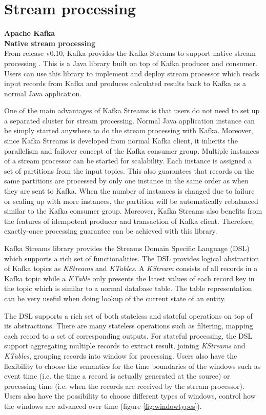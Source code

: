 \section{Stream processing}
\large \textbf{Apache Kafka}\\
\normalsize
\textbf{Native stream processing}\\
From release v0.10, Kafka provides the Kafka Streams to support native stream processing \cite{kafkastreams}. This is a Java library built on top of Kafka producer and consumer. Users can use this library to implement and deploy stream processor which reads input records from Kafka and produces calculated results back to Kafka as a normal Java application. 

One of the main advantages of Kafka Streams is that users do not need to set up a separated cluster for stream processing. Normal Java application instance can be simply started anywhere to do the stream processing with Kafka. Moreover, since Kafka Streams is developed from normal Kafka client, it inherits the parallelism and failover concept of the Kafka consumer group. Multiple instances of a stream processor can be started for scalability. Each instance is assigned a set of partitions from the input topics. This also guarantees that records on the same partitions are processed by only one instance in the same order as when they are sent to Kafka. When the number of instances is changed due to failure or scaling up with more instances, the partition will be automatically rebalanced similar to the Kafka consumer group. Moreover, Kafka Streams also benefits from the features of idempotent producer and transaction of Kafka client. Therefore, exactly-once processing guarantee can be achieved with this library.

Kafka Streams library provides the Streams Domain Specific Language (DSL) which supports a rich set of functionalities. The DSL provides logical abstraction of Kafka topics as \emph{KStreams} and \emph{KTables}. A \emph{KStream} consists of all records in a Kafka topic while a \emph{KTable} only presents the latest values of each record key in the topic which is similar to a normal database table. The table representation can be very useful when doing lookup of the current state of an entity. 

The DSL supports a rich set of both stateless and stateful operations on top of its abstractions. There are many stateless operations such as filtering, mapping each record to a set of corresponding outputs. For stateful processing, the DSL support aggregating multiple records to extract result, joining \emph{KStreams} and \emph{KTables}, grouping records into window for processing. Users also have the flexibility to choose the semantics for the time boundaries of the windows such as event time (i.e. the time a record is actually generated at the source) or processing time (i.e. when the records are received by the stream processor). Users also have the possibility to choose different types of windows, control how the windows are advanced over time (figure \ref{fig:windowtypes}).

